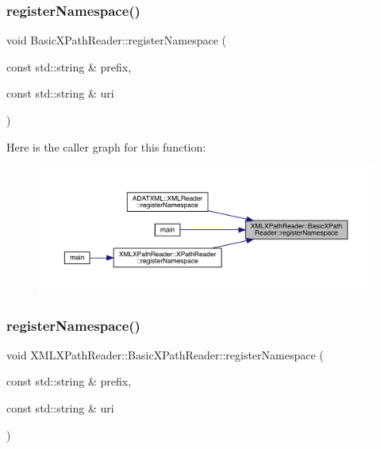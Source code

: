 \subsubsection{\texorpdfstring{registerNamespace()}{registerNamespace()}\hspace{0.1cm}{\footnotesize\ttfamily [1/2]}}
{\footnotesize\ttfamily void Basic\+X\+Path\+Reader\+::register\+Namespace (\begin{DoxyParamCaption}\item[{const std\+::string \&}]{prefix,  }\item[{const std\+::string \&}]{uri }\end{DoxyParamCaption})}

Here is the caller graph for this function\+:
\nopagebreak
\begin{figure}[H]
\begin{center}
\leavevmode
\includegraphics[width=350pt]{d6/dbf/classXMLXPathReader_1_1BasicXPathReader_a6c6d6e977694344a70506a24bebe853d_icgraph}
\end{center}
\end{figure}
\mbox{\label{classXMLXPathReader_1_1BasicXPathReader_a5991605f4cda926b146829be5798b037}} 
\subsubsection{\texorpdfstring{registerNamespace()}{registerNamespace()}\hspace{0.1cm}{\footnotesize\ttfamily [2/2]}}
{\footnotesize\ttfamily void X\+M\+L\+X\+Path\+Reader\+::\+Basic\+X\+Path\+Reader\+::register\+Namespace (\begin{DoxyParamCaption}\item[{const std\+::string \&}]{prefix,  }\item[{const std\+::string \&}]{uri }\end{DoxyParamCaption})}

